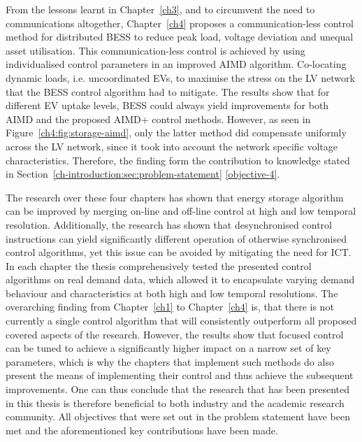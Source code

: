 From the lessons learnt in Chapter~\ref{ch3}, and to circumvent the need to communications altogether, Chapter~\ref{ch4} proposes a communication-less control method for distributed BESS to reduce peak load, voltage deviation and unequal asset utilisation.
This communication-less control is achieved by using individualised control parameters in an improved AIMD algorithm.
Co-locating dynamic loads, i.e. uncoordinated EVs, to maximise the stress on the LV network that the BESS control algorithm had to mitigate.
The results show that for different EV uptake levels, BESS could always yield improvements for both AIMD and the proposed AIMD+ control methods.
However, as seen in Figure~\ref{ch4:fig:storage-aimd}, only the latter method did compensate uniformly across the LV network, since it took into account the network specific voltage characteristics.
Therefore, the finding form the contribution to knowledge stated in Section~\ref{ch-introduction:sec:problem-statement} \ref{objective-4}.

The research over these four chapters has shown that energy storage algorithm can be improved by merging on-line and off-line control at high and low temporal resolution.
Additionally, the research has shown that desynchronised control instructions can yield significantly different operation of otherwise synchronised control algorithms, yet this issue can be avoided by mitigating the need for ICT.
In each chapter the thesis comprehensively tested the presented control algorithms on real demand data, which allowed it to encapsulate varying demand behaviour and characteristics at both high and low temporal resolutions.
The overarching finding from Chapter~\ref{ch1} to Chapter~\ref{ch4} is, that there is not currently a single control algorithm that will consistently outperform all proposed covered aspects of the research.
However, the results show that focused control can be tuned to achieve a significantly higher impact on a narrow set of key parameters, which is why the chapters that implement such methods do also present the means of implementing their control and thus achieve the subsequent improvements.
One can thus conclude that the research that has been presented in this thesis is therefore beneficial to both industry and the academic research community.
All objectives that were set out in the problem statement have been met and the aforementioned key contributions have been made.


